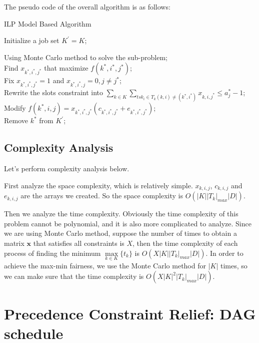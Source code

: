 \documentclass{llncs}
\begin{document}
The pseudo code of the overall algorithm is as follows:

\begin{minipage}[t]{0.8\textwidth}
    \begin{algorithm}[H]
        \BlankLine
        \caption{ILP Model Based Algorithm}
        Initialize a job set $ K^{\prime} = K $;

        {
            Using Monte Carlo method to solve the sub-problem;\\
            Find $x_{k^*,i^*,j^*}$ that maximize $ f(k^*,i^*,j^*) $;\\
            Fix $x_{k^*,i^*,j^*} = 1$ and  $x_{k^*,i^*,j} = 0, j \neq j^*$;\\
            Rewrite the slots constraint into $ \sum\limits_{ k\in K } \sum\limits_{tsk_i \in T_k (k,i) \neq (k^*,i^*) } x_{k,i,j^*} \leqslant a_j^*  - 1$;\\
            Modify $ f(k^*,i,j) =  x_{k^*,i^*,j^*}(c_{k^*,i^*,j^*}+e_{k^*,i^*,j^*}) $;\\
            Remove $ k^* $ from $ K^{\prime} $;
        }
        
    \end{algorithm}
    \end{minipage}

\subsection{Complexity Analysis}

Let's perform complexity analysis below.

First analyze the space complexity, which is relatively simple. $  x_{k,i,j} $, $ c_{k,i,j} $ and $ e_{k,i,j} $ are the arrays we created. So the space complexity is $ O(|K||T_k|_{max}|D|) $.

Then we analyze the time complexity. Obviously the time complexity of this problem cannot be polynomial, and it is also more complicated to analyze. Since we are using Monte Carlo method, suppose the number of times to obtain a matrix $ \mathbf{x} $ that satisfies all constraints is $ X $, then the time complexity of each process of finding the minimum $  \mathop{max}\limits_{k \in K} \{ t_k \} $ is $ O(X|K||T_k|_{max}|D|) $. In order to achieve the max-min fairness, we use the  Monte Carlo method for $ |K| $ times, so we can make sure that the time complexity is $ O(X|K|^2|T_k|_{max}|D|) $.

\section{Precedence Constraint Relief: DAG schedule}
\end{document}

